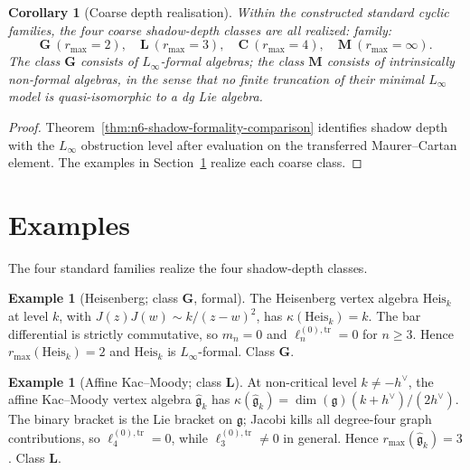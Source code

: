 \documentclass[11pt,reqno]{amsart}
\newtheorem{corollary}[theorem]{Corollary}
\theoremstyle{definition}
\newtheorem{example}[theorem]{Example}
\theoremstyle{remark}
\providecommand{\fg}{\mathfrak{g}}
\providecommand{\Heis}{\mathrm{Heis}}
\providecommand{\Linf}{L_\infty}
\numberwithin{equation}{section}
\begin{document}
\begin{corollary}[Coarse depth realisation]
\label{cor:n6-coarse-depth-realisation}
Within the constructed standard cyclic families, the four coarse
shadow-depth classes are all realized:
family:
\[
\textbf{G}\ (r_{\max}=2),\quad
\textbf{L}\ (r_{\max}=3),\quad
\textbf{C}\ (r_{\max}=4),\quad
\textbf{M}\ (r_{\max}=\infty).
\]
The class $\textbf{G}$ consists of $\Linf$-formal algebras; the
class $\textbf{M}$ consists of intrinsically non-formal
algebras, in the sense that no finite truncation of their
minimal $\Linf$ model is quasi-isomorphic to a dg Lie algebra.
\end{corollary}

\begin{proof}
Theorem~\ref{thm:n6-shadow-formality-comparison} identifies shadow depth with the
$\Linf$ obstruction level after evaluation on the transferred
Maurer--Cartan element. The examples in Section~\ref{sec:examples}
realize each coarse class.
\end{proof}

\section{Examples}\label{sec:examples}

The four standard families realize the four shadow-depth classes.

\begin{example}[Heisenberg; class \textbf{G}, formal]
The Heisenberg vertex algebra $\Heis_k$ at level $k$, with
$J(z)J(w)\sim k/(z-w)^2$, has $\kappa(\Heis_k)=k$. The bar
differential is strictly commutative, so $m_n=0$ and
$\ell_n^{(0),\mathrm{tr}}=0$ for $n\ge 3$. Hence
$r_{\max}(\Heis_k)=2$ and $\Heis_k$ is $\Linf$-formal. Class
$\textbf{G}$.
\end{example}

\begin{example}[Affine Kac--Moody; class \textbf{L}]
At non-critical level $k\ne-h^\vee$, the affine Kac--Moody
vertex algebra $\widehat{\fg}_k$ has
$\kappa(\widehat{\fg}_k)=\dim(\fg)(k+h^\vee)/(2h^\vee)$. The
binary bracket is the Lie bracket on $\fg$; Jacobi kills all
degree-four graph contributions, so $\ell_4^{(0),\mathrm{tr}}=0$,
while $\ell_3^{(0),\mathrm{tr}}\ne 0$ in general. Hence
$r_{\max}(\widehat{\fg}_k)=3$. Class $\textbf{L}$.
\end{example}
\end{document}
